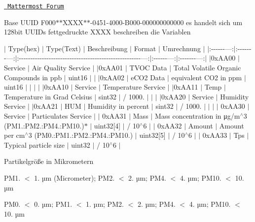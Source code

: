 \href{https://mattermost.fbi.h-da.de/pse-mayer-ss19/channels/sensorik}{\texttt{ Mattermost Forum}}

Base U\+U\+ID F000$\ast$$\ast$\+X\+X\+X\+X$\ast$$\ast$-\/0451-\/4000-\/\+B000-\/000000000000 es handelt sich um 128bit U\+U\+I\+Ds fettgedruckte X\+X\+XX beschreiben die Variablen

$\vert$ Type(hex) $\vert$ Type(\+Text) $\vert$ Beschreibung $\vert$ Format $\vert$ Umrechnung $\vert$ $\vert$\+:-\/-\/-\/-\/-\/-\/---\+:$\vert$\+:-\/-\/-\/-\/-\/-\/-\/---\+:$\vert$\+:-\/-\/-\/-\/-\/-\/-\/-\/-\/-\/-\/-\/-\/-\/-\/-\/-\/-\/-\/-\/-\/-\/-\/-\/-\/-\/-\/-\/-\/-\/-\/-\/-\/-\/-\/-\/-\/-\/-\/-\/-\/-\/-\/-\/-\/-\/-\/-\/-\/-\/-\/-\/-\/---\+:$\vert$\+:-\/-\/-\/-\/-\/-\/---\+:$\vert$\+:-\/-\/-\/-\/-\/-\/-\/---\+:$\vert$ $\vert$0x\+A\+A00 $\vert$ Service $\vert$ Air Quality Service $\vert$ $\vert$0x\+A\+A01 $\vert$ T\+V\+OC Data $\vert$ Total Volatile Organic Compounds in ppb $\vert$ uint16 $\vert$ $\vert$ $\vert$0x\+A\+A02 $\vert$ e\+C\+O2 Data $\vert$ equivalent C\+O2 in ppm $\vert$ uint16 $\vert$ $\vert$ $\vert$ $\vert$ $\vert$0x\+A\+A10 $\vert$ Service $\vert$ Temperature Service $\vert$ $\vert$0x\+A\+A11 $\vert$ Temp $\vert$ Temperature in Grad Celsius $\vert$ sint32 $\vert$ / 1000. $\vert$ $\vert$ $\vert$ $\vert$0x\+A\+A20 $\vert$ Service $\vert$ Humidity Service $\vert$ $\vert$0x\+A\+A21 $\vert$ H\+UM $\vert$ Humidity in percent $\vert$ sint32 $\vert$ / 1000. $\vert$ $\vert$ $\vert$ $\vert$ 0x\+A\+A30 $\vert$ Service $\vert$ Particulates Service $\vert$ $\vert$ 0x\+A\+A31 $\vert$ Mass $\vert$ Mass concentration in μg/m$^\wedge$3 (P\+M1.\+:P\+M2.\+:P\+M4.\+:P\+M10.)$\ast$ $\vert$ uint32\mbox{[}4\mbox{]} $\vert$ / 10$^\wedge$6 $\vert$ $\vert$ 0x\+A\+A32 $\vert$ Amount $\vert$ Amount per cm$^\wedge$3 (P\+M0.\+:P\+M1.\+:P\+M2.\+:P\+M4.\+:P\+M10.) $\vert$ uint32\mbox{[}5\mbox{]} $\vert$ / 10$^\wedge$6 $\vert$ $\vert$ 0x\+A\+A33 $\vert$ Tps $\vert$ Typical particle size $\vert$ uint32 $\vert$ / 10$^\wedge$6 $\vert$


\begin{DoxyItemize}
\item Partikelgröße in Mikrometern
\end{DoxyItemize}

P\+M1. $<$ 1. µm (Micrometer); P\+M2. $<$ 2. µm; P\+M4. $<$ 4. µm; P\+M10. $<$ 10. µm

P\+M0. $<$ 0. µm; P\+M1. $<$ 1. µm; P\+M2. $<$ 2. µm; P\+M4. $<$ 4. µm; P\+M10. $<$ 10. µm

